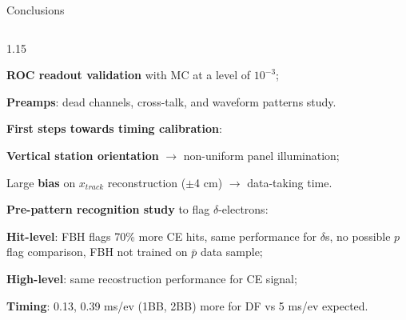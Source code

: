 \documentclass{beamer}
\begin{document}
\begin{frame}{Conclusions}
\begin{columns}
\begin{column}{1.15\framewidth}
\begin{itemize}
\begin{itemize}
\begin{itemize}
     
        {\footnotesize  \item \textbf{ROC readout validation} with MC at a level of $10^{-3}$;
        \vspace{1mm}
    \item \textbf{Preamps}: dead channels, 
cross-talk, and waveform patterns study.}
 \end{itemize}
    \vspace{1.2mm}
    {\footnotesize \item \textbf{First steps towards timing calibration}:}
  \vspace{1mm}
 \begin{itemize}
    {\footnotesize  \item \textbf{Vertical station orientation} $\rightarrow$ non-uniform panel illumination;
    \vspace{1mm}
     \item Large \textbf{bias} on $x_{track}$ reconstruction ($\pm$4 cm) $\rightarrow$ data-taking time.
    }
 \end{itemize}
   \vspace{1.2mm}
   {\footnotesize \item \textbf{Pre-pattern recognition study} to flag $\delta$-electrons:}
  \vspace{1mm}
  \begin{itemize}
    {\footnotesize  \item \textbf{Hit-level}: FBH flags 70\% more CE hits, same performance for $\delta$s, no possible $p$ flag comparison, FBH not trained on $\bar{p}$ data sample;
    \vspace{1mm}
    \item \textbf{High-level}: same recostruction performance for CE signal;
  \vspace{1mm}
  \item  \textbf{Timing}: 0.13, 0.39 ms/ev (1BB, 2BB) more for DF vs 5 ms/ev expected.}
 \end{itemize}
   \end{itemize}
    \end{itemize}
    \end{column}
\end{columns}

\end{frame}
\end{document}
